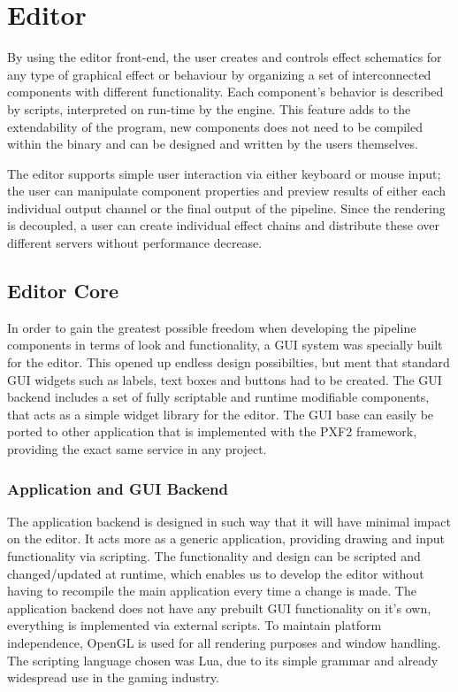 
\chapter{Editor}
 
By using the editor front-end, the user creates and controls effect schematics for any type of graphical effect or behaviour by organizing a set of interconnected components with different functionality. Each component’s behavior is described by scripts, interpreted on run-time by the engine. This feature adds to the extendability of the program, new components does not need to be compiled within the binary and can be designed and written by the users themselves.

The editor supports simple user interaction via either keyboard or mouse input; the user can manipulate component properties and preview results of either each individual output channel or the final output of the pipeline. Since the rendering is decoupled, a user can create individual effect chains and distribute these over different servers without performance decrease. 

\section{Editor Core}
In order to gain the greatest possible freedom when developing the pipeline components in terms of look and functionality, a GUI system was specially built for the editor. This opened up endless design possibilties, but ment that standard GUI widgets such as labels, text boxes and buttons had to be created. The GUI backend includes a set of fully scriptable and runtime modifiable components, that acts as a simple widget library for the editor. The GUI base can easily be ported to other application that is implemented with the PXF2 framework, providing the exact same service in any project. 

\subsection{Application and GUI Backend}
The application backend is designed in such way that it will have minimal impact on the editor. It acts more as a generic application, providing drawing and input functionality via scripting. The functionality and design can be scripted and changed/updated at runtime, which enables us to develop the editor without having to recompile the main application every time a change is made. The application backend does not have any prebuilt GUI functionality on it's own, everything is implemented via external scripts. To maintain platform independence, OpenGL is used for all rendering purposes and window handling. The scripting language chosen was Lua, due to its simple grammar and already widespread use in the gaming industry.

